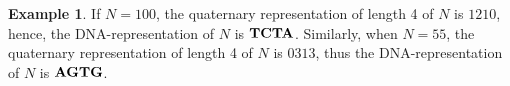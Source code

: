 \documentclass[conference]{IEEEtran}
\theoremstyle{plain}
\theoremstyle{definition}
\newtheorem{example}{Example}
\begin{document}
\begin{example}
If $N=100$, the quaternary representation of length 4 of $N$ is $1210$, hence, the DNA-representation of $N$ is ${\bf T}{\bf C}{\bf T}{\bf A}$. Similarly, when $N=55$, the quaternary representation of length 4 of $N$ is $0313$, thus the DNA-representation of $N$ is ${\bf A}{\bf G}{\bf T}{\bf G}$.
\end{example}

\end{document}
